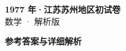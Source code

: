 \documentclass[zihao=-4, a4paper]{ctexart}
\begin{document}
\begin{center}
  {\Large\bfseries 1977 年·江苏苏州地区初试卷}\\[4pt]
  {\large 数学 · 解析版}
\end{center}
\medskip
{}

\clearpage
{}
\begin{center}{\Large\bfseries 参考答案与详细解析}\end{center}
\medskip

\end{document}
